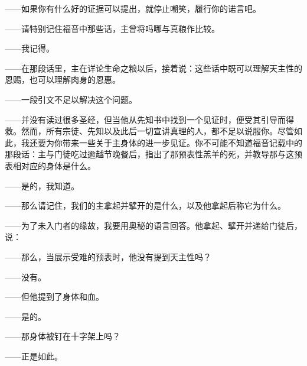 ——如果你有什么好的证据可以提出，就停止嘲笑，履行你的诺言吧。\par

——请特别记住福音中那些话，主曾将吗哪与真粮作比较。\par

——我记得。\par

——在那段话里，主在详论生命之粮以后，接着说：这些话中既可以理解天主性的恩赐，也可以理解肉身的恩惠。\par

——一段引文不足以解决这个问题。\par

——并没有读过很多圣经，但当他从先知书中找到一个见证时，便受其引导而得救。然而，所有宗徒、先知以及此后一切宣讲真理的人，都不足以说服你。尽管如此，我还要为你带来一些关于主身体的进一步见证。你不可能不知道福音记载中的那段话：主与门徒吃过逾越节晚餐后，指出了那预表性羔羊的死，并教导那与这预表相对应的身体是什么。\par

——是的，我知道。\par

——那么请记住，我们的主拿起并擘开的是什么，以及他拿起后称它为什么。\par

——为了未入门者的缘故，我要用奥秘的语言回答。他拿起、擘开并递给门徒后，说：\par

——那么，当展示受难的预表时，他没有提到天主性吗？\par

——没有。\par

——但他提到了身体和血。\par

——是的。\par

——那身体被钉在十字架上吗？\par

——正是如此。\par


